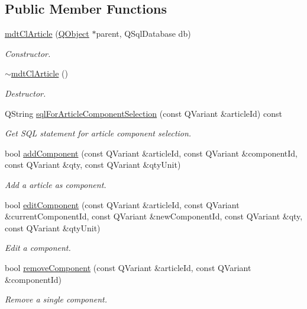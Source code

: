 \subsection*{Public Member Functions}
\begin{DoxyCompactItemize}
\item 
\hyperlink{classmdt_cl_article_a73d0867f06c579293bbfcbfc3f305616}{mdt\-Cl\-Article} (\hyperlink{class_q_object}{Q\-Object} $\ast$parent, Q\-Sql\-Database db)
\begin{DoxyCompactList}\small\item\em Constructor. \end{DoxyCompactList}\item 
\hyperlink{classmdt_cl_article_ac51272d232283ed61551e965abf3e112}{$\sim$mdt\-Cl\-Article} ()
\begin{DoxyCompactList}\small\item\em Destructor. \end{DoxyCompactList}\item 
Q\-String \hyperlink{classmdt_cl_article_ab739ef3c89503d971ded5830787dc4ff}{sql\-For\-Article\-Component\-Selection} (const Q\-Variant \&article\-Id) const 
\begin{DoxyCompactList}\small\item\em Get S\-Q\-L statement for article component selection. \end{DoxyCompactList}\item 
bool \hyperlink{classmdt_cl_article_a01746b199b707377f29a463bfc12452d}{add\-Component} (const Q\-Variant \&article\-Id, const Q\-Variant \&component\-Id, const Q\-Variant \&qty, const Q\-Variant \&qty\-Unit)
\begin{DoxyCompactList}\small\item\em Add a article as component. \end{DoxyCompactList}\item 
bool \hyperlink{classmdt_cl_article_a065c948e09af084586a4c1b110afefbb}{edit\-Component} (const Q\-Variant \&article\-Id, const Q\-Variant \&current\-Component\-Id, const Q\-Variant \&new\-Component\-Id, const Q\-Variant \&qty, const Q\-Variant \&qty\-Unit)
\begin{DoxyCompactList}\small\item\em Edit a component. \end{DoxyCompactList}\item 
bool \hyperlink{classmdt_cl_article_a05d365a0488e479a15ff158353a41aab}{remove\-Component} (const Q\-Variant \&article\-Id, const Q\-Variant \&component\-Id)
\begin{DoxyCompactList}\small\item\em Remove a single component. \end{DoxyCompactList}\item 

\end{DoxyCompactItemize}
